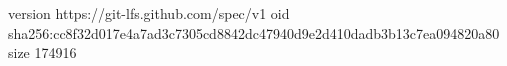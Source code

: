 version https://git-lfs.github.com/spec/v1
oid sha256:cc8f32d017e4a7ad3c7305cd8842dc47940d9e2d410dadb3b13c7ea094820a80
size 174916
